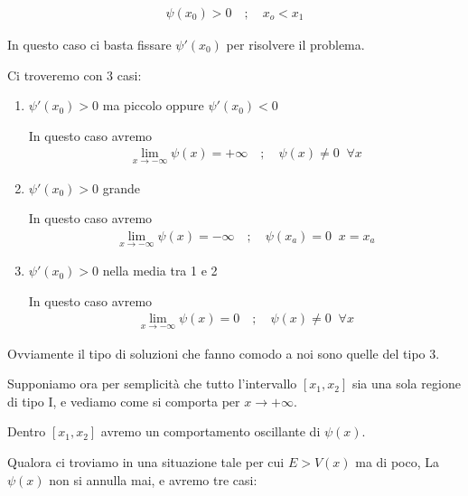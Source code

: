 \begin{align}
\psi(x_0)>0 \quad ; \quad x_o<x_1
\end{align}

In questo caso ci basta fissare $\psi'(x_0)$ per risolvere il problema.

Ci troveremo con 3 casi:

\begin{enumerate}
	\item $\psi'(x_0)>0$ ma piccolo oppure $\psi'(x_0)<0$
	
	In questo caso avremo 
	\begin{align}
	\lim_{x \rightarrow -\infty}\psi(x)=+\infty \quad ; \quad \psi(x)\neq 0 \;\; \forall x
	\end{align}
	
	
	\item $\psi'(x_0)>0$ grande

	In questo caso avremo 
	\begin{align}
	\lim_{x \rightarrow -\infty}\psi(x)=-\infty \quad ; \quad \psi(x_a)= 0 \;\; x=x_a
	\end{align}
	
	\item $\psi'(x_0)>0$ nella media tra 1 e 2
	
	In questo caso avremo 
	\begin{align}
	\lim_{x \rightarrow -\infty}\psi(x)=0 \quad ; \quad \psi(x) \neq 0 \;\; \forall x
	\end{align}
		
\end{enumerate}

Ovviamente il tipo di soluzioni che fanno comodo a noi sono quelle del tipo 3.

Supponiamo ora per semplicità che tutto l'intervallo $[x_1,x_2]$ sia una sola regione di tipo I, e vediamo come si comporta per $x\rightarrow +\infty$.

Dentro $[x_1,x_2]$ avremo un comportamento oscillante di $\psi(x)$.

\newpage

Qualora ci troviamo in una situazione tale per cui $E>V(x)$ ma di poco, La $\psi(x)$ non si annulla mai, e avremo tre casi:


